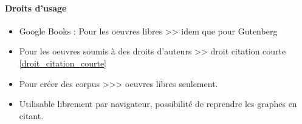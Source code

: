 \documentclass{book}
\newenvironment{titlemize}[1]{%
  \paragraph{#1}
  \begin{itemize}}
  {\end{itemize}}
\begin{document}
\begin{enumerate}
\begin{enumerate}
        \end{enumerate} 

        \begin{titlemize}{Droits d'usage}
            \item Google Books : Pour les oeuvres libres >> idem que pour Gutenberg
            \item Pour les oeuvres soumis à des droits d'auteurs >> droit citation courte \ref{droit_citation_courte}
            \item Pour créer des corpus >>> oeuvres libres seulement.
            \item Utilisable librement par navigateur, possibilité de reprendre les graphes en citant.
        \end{titlemize}
            
              
    \end{enumerate}
    
    
\end{document}
